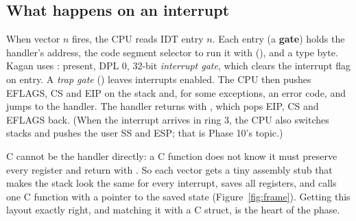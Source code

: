 \documentclass[11pt,a4paper]{article}
\begin{document}
\subsection{What happens on an interrupt}

When vector $n$ fires, the CPU reads IDT entry $n$. Each entry (a \textbf{gate}) holds the handler's address, the
code segment selector to run it with (), and a type byte. Kagan uses : present, DPL 0, 32-bit
\emph{interrupt gate}, which clears the interrupt flag on entry. A \emph{trap gate} () leaves interrupts
enabled. The CPU then pushes EFLAGS, CS and EIP on the stack and, for some exceptions, an error code, and jumps to the
handler. The handler returns with , which pops EIP, CS and EFLAGS back. (When the interrupt arrives in ring
3, the CPU also switches stacks and pushes the user SS and ESP; that is Phase 10's topic.)

C cannot be the handler directly: a C function does not know it must preserve every register and return with
. So each vector gets a tiny assembly stub that makes the stack look the same for every interrupt,
saves all registers, and calls one C function with a pointer to the saved state (Figure~\ref{fig:frame}). Getting
this layout exactly right, and matching it with a C struct, is the heart of the phase.
\end{document}
